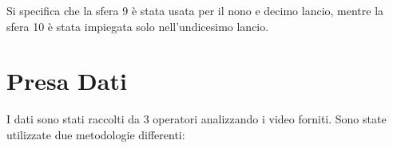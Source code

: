 \documentclass[a4paper,11pt,oneside]{article}
\begin{document}
\bigskip
\bigskip
\begin{table}[h!]
    \centering
    \caption{Diametri sfere}
    \label{tab:diametri_sfere}
\end{table}

Si specifica che la sfera 9 è stata usata per il nono e decimo lancio, mentre la sfera 10 è stata impiegata solo nell'undicesimo lancio.

\section{Presa Dati}
I dati sono stati raccolti da 3 operatori analizzando i video forniti.
Sono state utilizzate due metodologie differenti:
\end{document}
